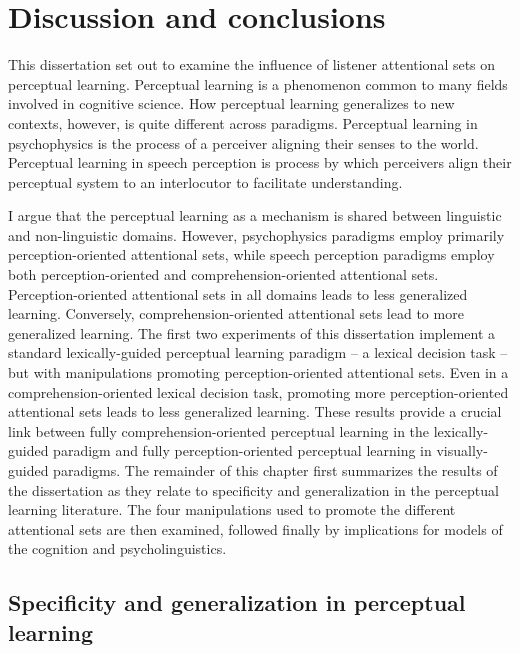 
\chapter{Discussion and conclusions}
\label{chap:conclusion}

This dissertation set out to examine the influence of listener attentional sets on perceptual learning.
Perceptual learning is a phenomenon common to many fields involved in cognitive science.
How perceptual learning generalizes to new contexts, however, is quite different across paradigms.
Perceptual learning in psychophysics is the process of a perceiver aligning their senses to the world.
Perceptual learning in speech perception is process by which perceivers align their perceptual system to an interlocutor to facilitate understanding.

I argue that the perceptual learning as a mechanism is shared between linguistic and non-linguistic domains.
However, psychophysics paradigms employ primarily perception-oriented attentional sets, while speech perception paradigms employ both perception-oriented and comprehension-oriented attentional sets.
Perception-oriented attentional sets in all domains leads to less generalized learning.
Conversely, comprehension-oriented attentional sets lead to more generalized learning.
The first two experiments of this dissertation implement a standard lexically-guided perceptual learning paradigm -- a lexical decision task -- but with manipulations promoting perception-oriented attentional sets.
Even in a comprehension-oriented lexical decision task, promoting more perception-oriented attentional sets leads to less generalized learning.
These results provide a crucial link between fully comprehension-oriented perceptual learning in the lexically-guided paradigm and fully perception-oriented perceptual learning in visually-guided paradigms.
The remainder of this chapter first summarizes the results of the dissertation as they relate to specificity and generalization in the perceptual learning literature.
The four manipulations used to promote the different attentional sets are then examined, followed finally by implications for models of the cognition and psycholinguistics.

\section{Specificity and generalization in perceptual learning}

